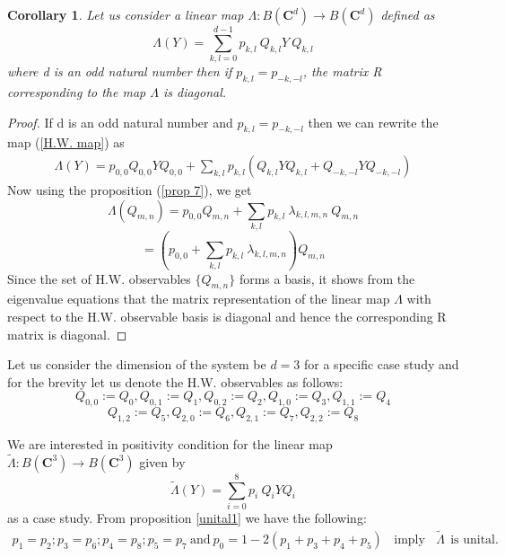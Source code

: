 \documentclass[12pt]{amsart}
\numberwithin{equation}{section}
\newtheorem{corollary}{Corollary}[section]
\begin{document}
 
 
 
 
 
 
 
 
 \begin{corollary}
     Let us consider a linear map $\Lambda : B\left(\mathbf{C}^d\right) \rightarrow B\left(\mathbf{C}^d\right)$ defined as 
\begin{equation}\label{H.W. map}
    \Lambda (Y) = \sum_{k,l=0}^{d-1} p_{k,l}~ Q_{k,l} Y~ Q_{k,l}
\end{equation}
   where d is an odd natural number then if  $p_{k,l}=p_{-k,-l}$, the matrix R corresponding to the map $\Lambda$ is diagonal.
 \end{corollary}
 \begin{proof}
         If d is an odd natural number and $p_{k,l}=p_{-k,-l}$ then we can rewrite the map (\ref{H.W. map}) as
         \begin{eqnarray*}
          \Lambda (Y) = p_{0,0} Q_{0,0} Y Q_{0,0}+\sum_{k,l}  p_{k,l} \left(Q_{k,l} Y Q_{k,l} +Q_{-k,-l} Y Q_{-k,-l}\right)
         \end{eqnarray*}
     Now using the proposition (\ref{prop 7}), we get
     \[\Lambda (Q_{m,n})=p_{0,0} Q_{m,n}+\sum_{k,l} p_{k,l}~ \lambda_{k,l,m,n} ~Q_{m,n}\]
     \[=\left( p_{0,0}+ \sum_{k,l} p_{k,l}~ \lambda_{k,l,m,n}\right) Q_{m,n}\]
     Since the set of H.W. observables $\lbrace Q_{m,n} \rbrace$ forms a basis, it shows from the eigenvalue equations that the matrix representation of the linear map $\Lambda$ with respect to the H.W. observable basis is diagonal and hence the corresponding R matrix is diagonal.
     \end{proof} 
 
 
 
 
 
 
 
 
 
 
 
 
 
 
 
 
 
 
 
 
 Let us consider the dimension of the system be $d=3$ for a specific case study and for the brevity let us denote the H.W. observables as follows:
\[Q_{0,0}:=Q_0,Q_{0,1}:=Q_1,Q_{0,2}:=Q_2,Q_{1,0}:=Q_3,Q_{1,1}:=Q_4\]\[Q_{1,2}:=Q_5,Q_{2,0}:=Q_6,Q_{2,1}:=Q_7, Q_{2,2}:=Q_8\]






We are interested in positivity condition for the  linear map $\tilde\Lambda:B\left(\mathbf{C}^3 \right) \rightarrow B\left(\mathbf{C}^3\right) $ given by
\begin{equation}\label{d=3}
    \tilde\Lambda (Y)=\sum_{i=0}^8 p_i ~Q_i Y Q_i
\end{equation}
as a case study.
From proposition \ref{unital1} we have the following:
\begin{eqnarray*}
    p_1=p_2; p_3=p_6; p_4=p_8; p_5=p_7 ~\text{and}~ p_0=1-2(p_1+p_3+p_4+p_5)  ~~~~\text{imply}~~~~ \tilde\Lambda ~~\text{is unital}.
\end{eqnarray*}
\end{document}
